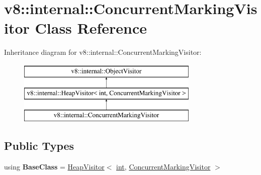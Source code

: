 \hypertarget{classv8_1_1internal_1_1ConcurrentMarkingVisitor}{}\section{v8\+:\+:internal\+:\+:Concurrent\+Marking\+Visitor Class Reference}
\label{classv8_1_1internal_1_1ConcurrentMarkingVisitor}
Inheritance diagram for v8\+:\+:internal\+:\+:Concurrent\+Marking\+Visitor\+:\begin{figure}[H]
\begin{center}
\leavevmode
\includegraphics[height=3.000000cm]{classv8_1_1internal_1_1ConcurrentMarkingVisitor}
\end{center}
\end{figure}
\subsection*{Public Types}
\begin{DoxyCompactItemize}
\item 
\mbox{\label{classv8_1_1internal_1_1ConcurrentMarkingVisitor_aa3c506ec63eb0731e227e289ccb16b99}} 
using {\bfseries Base\+Class} = \mbox{\hyperlink{classv8_1_1internal_1_1HeapVisitor}{Heap\+Visitor}}$<$ \mbox{\hyperlink{classint}{int}}, \mbox{\hyperlink{classv8_1_1internal_1_1ConcurrentMarkingVisitor}{Concurrent\+Marking\+Visitor}} $>$
\end{DoxyCompactItemize}
